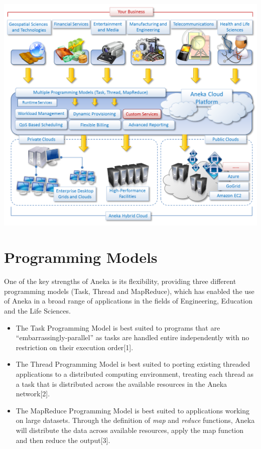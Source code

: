 \begin{center}
\includegraphics[scale=0.6]{figs/Aneka.png} \\
\end{center}

\section{Programming Models}
One of the key strengths of Aneka is its flexibility, providing three different programming models (Task, Thread and MapReduce), which has enabled the use of Aneka in a broad range of applications in the fields of Engineering, Education and the Life Sciences.
\begin{itemize}
\item The Task Programming Model is best suited to programs that are ``embarrassingly-parallel'' as tasks are handled entire independently with no restriction on their execution order[1].

\item The Thread Programming Model is best suited to porting existing threaded applications to a distributed computing environment, treating each thread as a task that is distributed across the available resources in the Aneka network[2].

\item The MapReduce Programming Model is best suited to applications working on large datasets. Through the definition of \emph{map} and \emph{reduce} functions, Aneka will distribute the data across available resources, apply the map function and then reduce the output[3].
\end{itemize}

